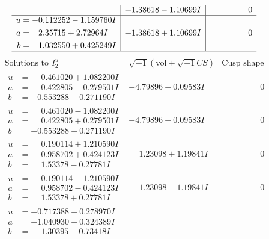 \documentclass[1p]{elsarticle_modified}
\theoremstyle{definition}
\newcommand{\I}{\sqrt{-1}}
\begin{document}
$$\begin{array}{c|c|c}
 & -1.38618 - 1.10699 I & \phantom{-0.000000 } 0 \\ \hline\begin{aligned}
u &= -0.112252 - 1.159760 I \\
a &= \phantom{-}2.35715 + 2.72964 I \\
b &= \phantom{-}1.032550 + 0.425249 I\end{aligned}
 & -1.38618 + 1.10699 I & \phantom{-0.000000 } 0\\
 \hline 
 \end{array}$$\newpage$$\begin{array}{c|c|c}  
\text{Solutions to }I^u_{2}& \I (\text{vol} + \sqrt{-1}CS) & \text{Cusp shape}\\
 \hline 
\begin{aligned}
u &= \phantom{-}0.461020 + 1.082200 I \\
a &= \phantom{-}0.422805 - 0.279501 I \\
b &= -0.553288 + 0.271190 I\end{aligned}
 & -4.79896 + 0.09583 I & \phantom{-0.000000 } 0 \\ \hline\begin{aligned}
u &= \phantom{-}0.461020 - 1.082200 I \\
a &= \phantom{-}0.422805 + 0.279501 I \\
b &= -0.553288 - 0.271190 I\end{aligned}
 & -4.79896 - 0.09583 I & \phantom{-0.000000 } 0 \\ \hline\begin{aligned}
u &= \phantom{-}0.190114 + 1.210590 I \\
a &= \phantom{-}0.958702 + 0.424123 I \\
b &= \phantom{-}1.53378 - 0.27781 I\end{aligned}
 & \phantom{-}1.23098 + 1.19841 I & \phantom{-0.000000 } 0 \\ \hline\begin{aligned}
u &= \phantom{-}0.190114 - 1.210590 I \\
a &= \phantom{-}0.958702 - 0.424123 I \\
b &= \phantom{-}1.53378 + 0.27781 I\end{aligned}
 & \phantom{-}1.23098 - 1.19841 I & \phantom{-0.000000 } 0 \\ \hline\begin{aligned}
u &= -0.717388 + 0.278970 I \\
a &= -1.040930 - 0.324389 I \\
b &= \phantom{-}1.30395 - 0.73418 I\end{aligned}

\end{array}$$
\end{document}
